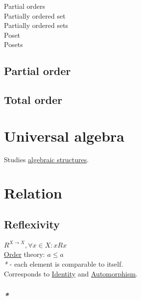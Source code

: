 \documentclass[a4paper,14pt,oneside]{book}
\begin{document}
\label{orgcc988e8}Partial orders\\
\label{org43f8e76}Partially ordered set\\
\label{org37b78eb}Partially ordered sets\\
\label{org1482bbc}Poset\\
\label{org5589451}Posets\\

\section{\label{org413d5f2}Partial order}
\label{sec:org41c2583}

\section{\label{orge7965de}Total order}
\label{sec:orgd48eb62}

\chapter{\label{org7419afe}Universal algebra}
\label{sec:orgd83f341}

Studies \hyperref[org4757347]{algebraic structures}.\\

\chapter{\label{org611b345}Relation}
\label{sec:orge91312a}

\section{\label{org4692d5e}Reflexivity}
\label{sec:org08be1ce}

\(R^{X \to X}, \forall x \in X : x R x\)\\
\hyperref[org31793bd]{Order} theory: \(a \le a\)\\

\emph{*} - each element is comparable to itself.\\

Corresponds to \hyperref[org8140c9c]{Identity} and \hyperref[orgb5b5b2d]{Automorphism}.\\

\subsection{\emph{*}}
\label{sec:orgdcabfc4}
\end{document}
